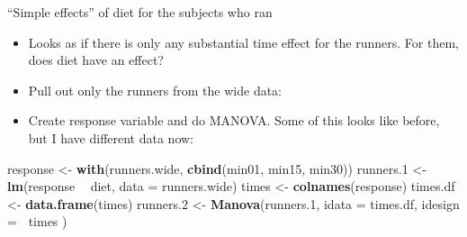 \documentclass[ignorenonframetext,]{beamer}
\newenvironment{Shaded}{\begin{snugshade}}{\end{snugshade}}
\newcommand{\DataTypeTok}[1]{\textcolor[rgb]{0.13,0.29,0.53}{#1}}
\newcommand{\FloatTok}[1]{\textcolor[rgb]{0.00,0.00,0.81}{#1}}
\newcommand{\KeywordTok}[1]{\textcolor[rgb]{0.13,0.29,0.53}{\textbf{#1}}}
\newcommand{\NormalTok}[1]{#1}
\newcommand{\OperatorTok}[1]{\textcolor[rgb]{0.81,0.36,0.00}{\textbf{#1}}}
\newcommand{\StringTok}[1]{\textcolor[rgb]{0.31,0.60,0.02}{#1}}
\providecommand{\tightlist}{%
  \setlength{\itemsep}{0pt}\setlength{\parskip}{0pt}}
\begin{document}
\begin{frame}[fragile]{``Simple effects'' of diet for the subjects who
ran}
\protect\hypertarget{simple-effects-of-diet-for-the-subjects-who-ran}{}

\begin{itemize}
\item
  Looks as if there is only any substantial time effect for the runners.
  For them, does diet have an effect?
\item
  Pull out only the runners from the wide data:
\end{itemize}

\begin{Shaded}
\end{Shaded}

\begin{itemize}
\tightlist
\item
  Create response variable and do MANOVA. Some of this looks like
  before, but I have different data now:
\end{itemize}

\footnotesize

\begin{Shaded}
\begin{Highlighting}[]
\NormalTok{response <-}\StringTok{ }\KeywordTok{with}\NormalTok{(runners.wide, }\KeywordTok{cbind}\NormalTok{(min01, min15, min30))}
\NormalTok{runners}\FloatTok{.1}\NormalTok{ <-}\StringTok{ }\KeywordTok{lm}\NormalTok{(response }\OperatorTok{~}\StringTok{ }\NormalTok{diet, }\DataTypeTok{data =}\NormalTok{ runners.wide)}
\NormalTok{times <-}\StringTok{ }\KeywordTok{colnames}\NormalTok{(response)}
\NormalTok{times.df <-}\StringTok{ }\KeywordTok{data.frame}\NormalTok{(times)}
\NormalTok{runners}\FloatTok{.2}\NormalTok{ <-}\StringTok{ }\KeywordTok{Manova}\NormalTok{(runners}\FloatTok{.1}\NormalTok{,}
  \DataTypeTok{idata =}\NormalTok{ times.df,}
  \DataTypeTok{idesign =} \OperatorTok{~}\NormalTok{times}
\NormalTok{)}
\end{Highlighting}
\end{Shaded}

\normalsize

\end{frame}
\end{document}
